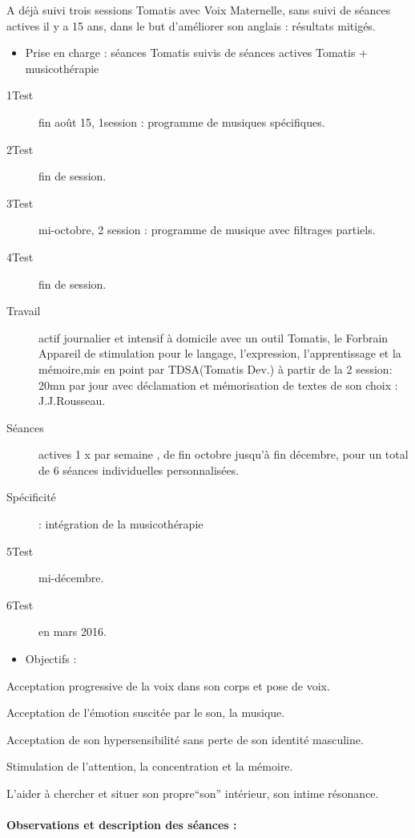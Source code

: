 \documentclass[12pt,french]{report}
\makeatletter
\let\SF@@footnote\footnote
\def\footnote{\ifx\protect\@typeset@protect
    \expandafter\SF@@footnote
  \else
    \expandafter\SF@gobble@opt
  \fi
}
\edef\SF@gobble@opt{\noexpand\protect
  \expandafter\noexpand\csname SF@gobble@opt \endcsname}
\makeatother
\begin{document}
A déjà suivi trois sessions Tomatis avec Voix Maternelle, sans suivi
de séances actives il y a 15 ans, dans le but d'améliorer son anglais
: résultats mitigés. 
\begin{itemize}
\item Prise en charge : séances Tomatis suivis de séances actives Tomatis
+ musicothérapie
\end{itemize}
\begin{description}
\item [{1\textdegree Test}] fin août 15, 1\textdegree session : programme
de musiques spécifiques.
\item [{2\textdegree Test}] fin de session.
\item [{3\textdegree Test}] mi-octobre, 2\textdegree{} session : programme
de musique avec filtrages partiels.
\item [{4\textdegree Test}] fin de session.
\item [{Travail}] actif journalier et intensif à domicile avec un outil
Tomatis, le Forbrain\footnote{Appareil de stimulation pour le langage, l'expression, l'apprentissage
et la mémoire,mis en point par TDSA(Tomatis Dev.) } à partir de la 2\textdegree{} session: 20mn par jour avec déclamation
et mémorisation de textes de son choix : J.J.Rousseau.
\item [{Séances}] actives 1 x par semaine , de fin octobre jusqu'à fin
décembre, pour un total de 6 séances individuelles personnalisées.
\item [{Spécificité}] : intégration de la musicothérapie
\item [{5\textdegree Test}] mi-décembre.
\item [{6\textdegree Test}] en mars 2016.
\end{description}
\begin{itemize}
\item Objectifs : 
\end{itemize}
Acceptation progressive de la voix dans son corps et pose de voix.

Acceptation de l'émotion suscitée par le son, la musique.

Acceptation de son hypersensibilité sans perte de son identité masculine.

Stimulation de l'attention, la concentration et la mémoire. 

L'aider à chercher et situer son propre``son'' intérieur, son intime
résonance.

\paragraph{Observations et description des séances : }
\end{document}
